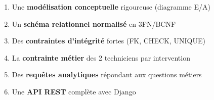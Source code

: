 \documentclass[12pt,a4paper]{article}
\begin{document}
\begin{enumerate}
    \item Une \textbf{modélisation conceptuelle} rigoureuse (diagramme E/A)
    \item Un \textbf{schéma relationnel normalisé} en 3FN/BCNF
    \item Des \textbf{contraintes d'intégrité} fortes (FK, CHECK, UNIQUE)
    \item La \textbf{contrainte métier} des 2 techniciens par intervention
    \item Des \textbf{requêtes analytiques} répondant aux questions métiers
    \item Une \textbf{API REST} complète avec Django
\end{enumerate}
\end{document}
